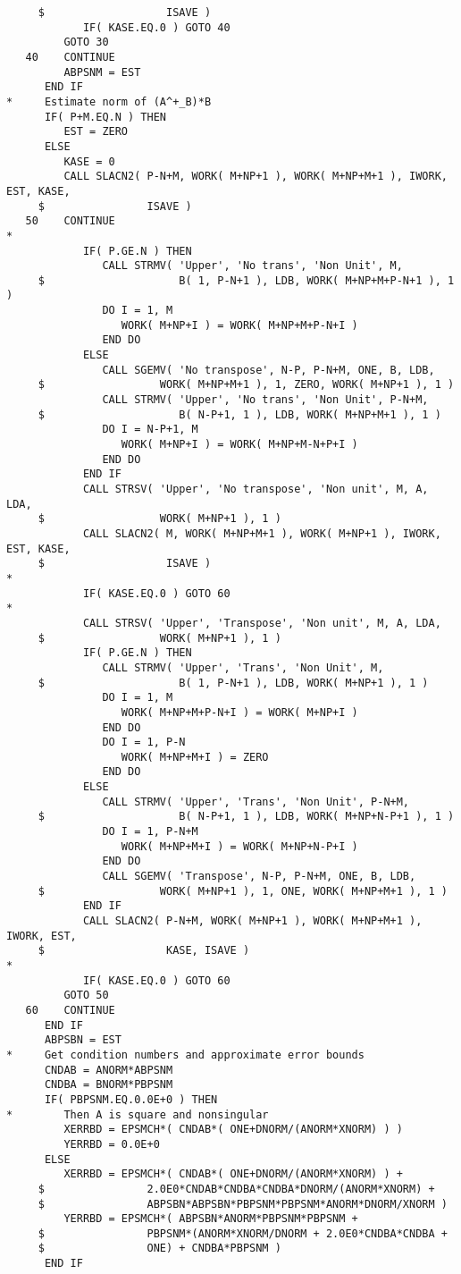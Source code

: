{\begin{verbatim}
     $                   ISAVE )
            IF( KASE.EQ.0 ) GOTO 40
         GOTO 30
   40    CONTINUE
         ABPSNM = EST
      END IF
*     Estimate norm of (A^+_B)*B
      IF( P+M.EQ.N ) THEN
         EST = ZERO
      ELSE
         KASE = 0
         CALL SLACN2( P-N+M, WORK( M+NP+1 ), WORK( M+NP+M+1 ), IWORK, EST, KASE,
     $                ISAVE )
   50    CONTINUE
*
            IF( P.GE.N ) THEN
               CALL STRMV( 'Upper', 'No trans', 'Non Unit', M,
     $                     B( 1, P-N+1 ), LDB, WORK( M+NP+M+P-N+1 ), 1 )
               DO I = 1, M
                  WORK( M+NP+I ) = WORK( M+NP+M+P-N+I )
               END DO
            ELSE
               CALL SGEMV( 'No transpose', N-P, P-N+M, ONE, B, LDB,
     $                  WORK( M+NP+M+1 ), 1, ZERO, WORK( M+NP+1 ), 1 )
               CALL STRMV( 'Upper', 'No trans', 'Non Unit', P-N+M,
     $                     B( N-P+1, 1 ), LDB, WORK( M+NP+M+1 ), 1 )
               DO I = N-P+1, M
                  WORK( M+NP+I ) = WORK( M+NP+M-N+P+I )
               END DO
            END IF
            CALL STRSV( 'Upper', 'No transpose', 'Non unit', M, A, LDA,
     $                  WORK( M+NP+1 ), 1 )
            CALL SLACN2( M, WORK( M+NP+M+1 ), WORK( M+NP+1 ), IWORK, EST, KASE,
     $                   ISAVE )
*
            IF( KASE.EQ.0 ) GOTO 60
*
            CALL STRSV( 'Upper', 'Transpose', 'Non unit', M, A, LDA,
     $                  WORK( M+NP+1 ), 1 )
            IF( P.GE.N ) THEN
               CALL STRMV( 'Upper', 'Trans', 'Non Unit', M,
     $                     B( 1, P-N+1 ), LDB, WORK( M+NP+1 ), 1 )
               DO I = 1, M
                  WORK( M+NP+M+P-N+I ) = WORK( M+NP+I )
               END DO
               DO I = 1, P-N
                  WORK( M+NP+M+I ) = ZERO
               END DO
            ELSE
               CALL STRMV( 'Upper', 'Trans', 'Non Unit', P-N+M,
     $                     B( N-P+1, 1 ), LDB, WORK( M+NP+N-P+1 ), 1 )
               DO I = 1, P-N+M
                  WORK( M+NP+M+I ) = WORK( M+NP+N-P+I )
               END DO
               CALL SGEMV( 'Transpose', N-P, P-N+M, ONE, B, LDB,
     $                  WORK( M+NP+1 ), 1, ONE, WORK( M+NP+M+1 ), 1 )
            END IF
            CALL SLACN2( P-N+M, WORK( M+NP+1 ), WORK( M+NP+M+1 ), IWORK, EST,
     $                   KASE, ISAVE )
*
            IF( KASE.EQ.0 ) GOTO 60
         GOTO 50
   60    CONTINUE
      END IF
      ABPSBN = EST
*     Get condition numbers and approximate error bounds
      CNDAB = ANORM*ABPSNM
      CNDBA = BNORM*PBPSNM
      IF( PBPSNM.EQ.0.0E+0 ) THEN
*        Then A is square and nonsingular
         XERRBD = EPSMCH*( CNDAB*( ONE+DNORM/(ANORM*XNORM) ) )
         YERRBD = 0.0E+0
      ELSE
         XERRBD = EPSMCH*( CNDAB*( ONE+DNORM/(ANORM*XNORM) ) +
     $                2.0E0*CNDAB*CNDBA*CNDBA*DNORM/(ANORM*XNORM) +
     $                ABPSBN*ABPSBN*PBPSNM*PBPSNM*ANORM*DNORM/XNORM )
         YERRBD = EPSMCH*( ABPSBN*ANORM*PBPSNM*PBPSNM +
     $                PBPSNM*(ANORM*XNORM/DNORM + 2.0E0*CNDBA*CNDBA +
     $                ONE) + CNDBA*PBPSNM )
      END IF
\end{verbatim}
}

